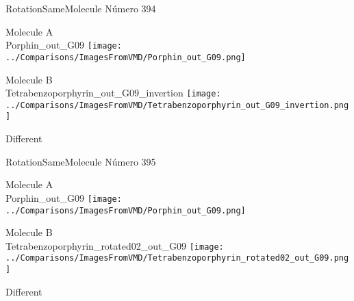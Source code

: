 \vtab[-3cm]
\begin{center}
{\large RotationSameMolecule \tab Número 394}
\end{center}
\begin{multicols}{2}
\begin{center}
Molecule A \\ 
Porphin\_out\_G09
\texttt{[image: ../Comparisons/ImagesFromVMD/Porphin\_out\_G09.png]}
\\
\vtab

\columnbreak
Molecule B \\ 
Tetrabenzoporphyrin\_out\_G09\_invertion
\texttt{[image: ../Comparisons/ImagesFromVMD/Tetrabenzoporphyrin\_out\_G09\_invertion.png]}
\\
\vtab


\end{center}
\end{multicols}
\begin{center}
\textcolor{NavyBlue}{\Large Different}
\end{center}

 \newpage

\vtab[-3cm]
\begin{center}
{\large RotationSameMolecule \tab Número 395}
\end{center}
\begin{multicols}{2}
\begin{center}
Molecule A \\ 
Porphin\_out\_G09
\texttt{[image: ../Comparisons/ImagesFromVMD/Porphin\_out\_G09.png]}
\\
\vtab

\columnbreak
Molecule B \\ 
Tetrabenzoporphyrin\_rotated02\_out\_G09
\texttt{[image: ../Comparisons/ImagesFromVMD/Tetrabenzoporphyrin\_rotated02\_out\_G09.png]}
\\
\vtab


\end{center}
\end{multicols}
\begin{center}
\textcolor{NavyBlue}{\Large Different}
\end{center}

 \newpage

